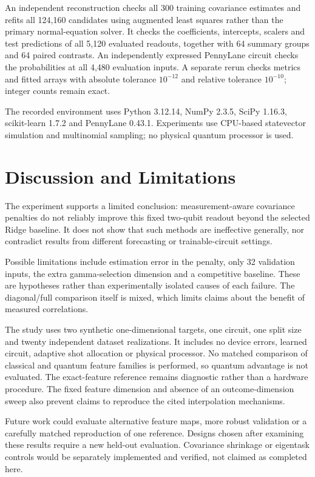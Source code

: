 \documentclass[conference]{IEEEtran}
\begin{document}
An independent reconstruction checks all 300 training covariance estimates and refits all 124,160 candidates using augmented least squares rather than the primary normal-equation solver. It checks the coefficients, intercepts, scalers and test predictions of all 5,120 evaluated readouts, together with 64 summary groups and 64 paired contrasts. An independently expressed PennyLane circuit checks the probabilities at all 4,480 evaluation inputs. A separate rerun checks metrics and fitted arrays with absolute tolerance $10^{-12}$ and relative tolerance $10^{-10}$; integer counts remain exact.

The recorded environment uses Python 3.12.14, NumPy 2.3.5, SciPy 1.16.3, scikit-learn 1.7.2 and PennyLane 0.43.1. Experiments use CPU-based statevector simulation and multinomial sampling; no physical quantum processor is used.

\section{Discussion and Limitations}
The experiment supports a limited conclusion: measurement-aware covariance penalties do not reliably improve this fixed two-qubit readout beyond the selected Ridge baseline. It does not show that such methods are ineffective generally, nor contradict results from different forecasting or trainable-circuit settings.

Possible limitations include estimation error in the penalty, only 32 validation inputs, the extra gamma-selection dimension and a competitive baseline. These are hypotheses rather than experimentally isolated causes of each failure. The diagonal/full comparison itself is mixed, which limits claims about the benefit of measured correlations.

The study uses two synthetic one-dimensional targets, one circuit, one split size and twenty independent dataset realizations. It includes no device errors, learned circuit, adaptive shot allocation or physical processor. No matched comparison of classical and quantum feature families is performed, so quantum advantage is not evaluated. The exact-feature reference remains diagnostic rather than a hardware procedure. The fixed feature dimension and absence of an outcome-dimension sweep also prevent claims to reproduce the cited interpolation mechanisms.

Future work could evaluate alternative feature maps, more robust validation or a carefully matched reproduction of one reference. Designs chosen after examining these results require a new held-out evaluation. Covariance shrinkage or eigentask controls would be separately implemented and verified, not claimed as completed here.
\end{document}
